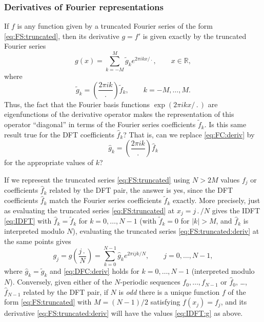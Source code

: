 \documentclass[12pt]{article}
\newcommand{\R}{\mathbb{R}}
\newcommand{\abs}[1]{\left|{#1}\right|}
\newcommand{\fc}[1]{\widetilde{#1}} %
\newcommand{\dfc}[1]{\widehat{#1}}  %
\begin{document}
\pagebreak[1]
\subsubsection{Derivatives of Fourier representations}

If $f$ is any function given by a truncated Fourier series of the form
\eqref{eq:FS:truncated}, then its derivative $g=f'$ is given exactly by the
truncated Fourier series
\begin{equation}
   g(x) = \sum_{k=-M}^{M} \fc{g}_k e^{2\pi ikx/\period},
\qquad x\in\R,
\label{eq:FS:truncated:deriv}
\end{equation}
where
\begin{equation}
   \fc{g}_k = \left(\frac{2\pi i k}{\period}\right) \fc{f}_k ,
\qquad k=-M,\dots,M.
\label{eq:FC:deriv}
\end{equation}
Thus, the fact that the Fourier basis functions $\exp(2\pi ikx/\period)$ are
eigenfunctions of the derivative operator makes the representation of this
operator ``diagonal'' in terms of the Fourier series coefficients $\fc{f}_k$.
Is this same result true for the DFT coefficients $\dfc{f}_k$?  That is, can
we replace \eqref{eq:FC:deriv} by
\begin{equation}
   \dfc{g}_k = \left(\frac{2\pi i k}{\period}\right) \dfc{f}_k 
\label{eq:DFC:deriv}
\end{equation}
for the appropriate values of $k$?  

If we represent the truncated series \eqref{eq:FS:truncated} using $N>2M$
values $f_j$ or coefficients $\dfc{f}_k$ related by the DFT pair, the answer
is yes, since the DFT coefficients $\dfc{f}_k$ match the Fourier series
coefficients $\fc{f}_k$ exactly.  More precisely, just as evaluating the
truncated series \eqref{eq:FS:truncated} at $x_j=j\period/N$ gives the IDFT
\eqref{eq:IDFT} with $\dfc{f}_k=\fc{f}_k$ for $k=0,\dots,N-1$ (with
$\fc{f}_k=0$ for $\abs{k}>M$, and $\dfc{f}_k$ is interpreted modulo $N$),
evaluating the truncated series \eqref{eq:FS:truncated:deriv} at the same
points gives
\begin{equation}
   g_j = g\left(\frac{j\period}{N}\right) 
       = \sum_{k=0}^{N-1} \dfc{g}_k e^{2\pi ijk/N},
\qquad j=0,\dots,N-1 ,
\label{eq:IDFT:g}
\end{equation}
where $\dfc{g}_k=\fc{g}_k$ and \eqref{eq:DFC:deriv} holds for $k=0,\dots,N-1$
(interpreted modulo $N$).  Conversely, given either of the $N$-periodic
sequences $f_0,\dots,f_{N-1}$ or $\dfc{f}_0$, \dots, $\dfc{f}_{N-1}$ related
by the DFT pair, if $N$ is \emph{odd} there is a unique function $f$ of the
form \eqref{eq:FS:truncated} with $M=(N-1)/2$ satisfying $f(x_j)=f_j$, and its
derivative \eqref{eq:FS:truncated:deriv} will have the values
\eqref{eq:IDFT:g} as above.  
\end{document}
